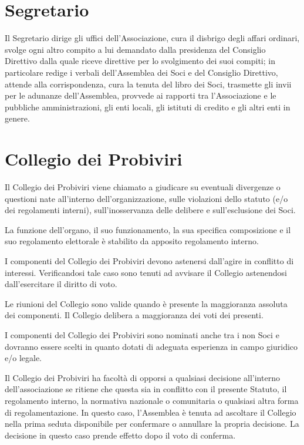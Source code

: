 \documentclass[legalpaper, 11pt]{exam}
\let\tempone\enumerate
\let\temptwo\endenumerate
\renewenvironment{enumerate}{\tempone\addtolength{\itemsep}{-0.45\baselineskip}}{\temptwo}
\begin{document}
{\section{Segretario}
\begin{enumerate}
 \item Il Segretario dirige gli uffici dell’Associazione, cura il disbrigo degli affari ordinari, svolge ogni altro compito a lui demandato dalla presidenza del Consiglio Direttivo dalla quale riceve direttive per lo svolgimento dei suoi compiti; in particolare redige i verbali dell’Assemblea dei Soci e del Consiglio Direttivo, attende alla corrispondenza, cura la tenuta del libro dei Soci, trasmette gli invii per le adunanze dell’Assemblea, provvede ai rapporti tra l’Associazione e le pubbliche amministrazioni, gli enti locali, gli istituti di credito e gli altri enti in genere.
\end{enumerate}

\section{Collegio dei Probiviri}
\begin{enumerate}
 \item Il Collegio dei Probiviri viene chiamato a giudicare su eventuali divergenze o questioni nate all’interno dell’organizzazione, sulle violazioni dello statuto (e/o dei regolamenti interni), sull’inosservanza delle delibere e sull’esclusione dei Soci.
 \item La funzione dell’organo, il suo funzionamento, la sua specifica composizione e il suo regolamento elettorale è stabilito da apposito regolamento interno.
 \item I componenti del Collegio dei Probiviri devono astenersi dall’agire in conflitto di interessi. Verificandosi tale caso sono tenuti ad avvisare il Collegio astenendosi dall’esercitare il diritto di voto.
 \item Le riunioni del Collegio sono valide quando è presente la maggioranza assoluta dei componenti. Il Collegio delibera a maggioranza dei voti dei presenti.
 \item I componenti del Collegio dei Probiviri sono nominati anche tra i non Soci e dovranno essere scelti in quanto dotati di adeguata esperienza in campo giuridico e/o legale.
 \item Il Collegio dei Probiviri ha facoltà di opporsi a qualsiasi decisione all'interno dell'associazione se ritiene che questa sia in conflitto con il presente Statuto, il regolamento interno, la normativa nazionale o comunitaria o qualsiasi altra forma di regolamentazione. In questo caso, l'Assemblea è tenuta ad ascoltare il Collegio nella prima seduta disponibile per confermare o annullare la propria decisione. La decisione in questo caso prende effetto dopo il voto di conferma.
\end{enumerate}

}
\end{document}
